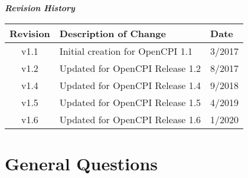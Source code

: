         \begin{center}
        \textit{\textbf{Revision History}}
                \begin{table}[H]
                \label{table:revisions} %
                        \begin{tabularx}{\textwidth}{|c|X|l|}
                        \hline
                        \rowcolor{blue}
                        \textbf{Revision} & \textbf{Description of Change} & \textbf{Date} \\
                        \hline
                        v1.1 & Initial creation for OpenCPI 1.1 & 3/2017 \\
                        \hline
                        v1.2 & Updated for OpenCPI Release 1.2 & 8/2017 \\
                        \hline
                        v1.4 & Updated for OpenCPI Release 1.4 & 9/2018 \\
                        \hline
                        v1.5 & Updated for OpenCPI Release 1.5 & 4/2019 \\
                        \hline
                        v1.6 & Updated for OpenCPI Release 1.6 & 1/2020 \\
                        \hline
                        \end{tabularx}
                \end{table}
        \end{center}
\newpage
\section{General Questions}

